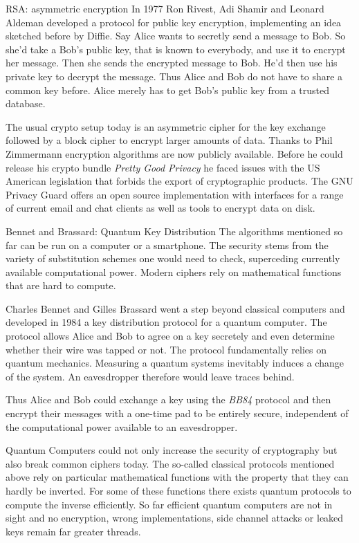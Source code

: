 \documentclass[final,hyperref={pdfpagelabels=false}]{beamer}
\begin{document}
\begin{frame}{}
\begin{columns}[t]
\begin{column}{.3\linewidth}
        \begin{block}{RSA: asymmetric encryption}
          In 1977 Ron Rivest, Adi Shamir and Leonard Aldeman developed a protocol for public key encryption, implementing an idea sketched before by Diffie. Say Alice wants to secretly send a message to Bob. So she'd take a Bob's public key, that is known to everybody, and use it to encrypt her message. Then she sends the encrypted message to Bob. He'd then use his private key to decrypt the message. Thus Alice and Bob do not have to share a common key before. Alice merely has to get Bob's public key from a trusted database. \par
          The usual crypto setup today is an asymmetric cipher for the key exchange followed by a block cipher to encrypt larger amounts of data. Thanks to Phil Zimmermann encryption algorithms are now publicly available. Before he could release his crypto bundle {\em Pretty Good Privacy} he faced issues with the US American legislation that forbids the export of cryptographic products. The GNU Privacy Guard offers an open source implementation with interfaces for a range of current email and chat clients as well as tools to encrypt data on disk.
        \end{block}

        \begin{block}{Bennet and Brassard: Quantum Key Distribution}
          The algorithms mentioned so far can be run on a computer or a smartphone. The security stems from the variety of substitution schemes one would need to check, superceding currently available computational power. Modern ciphers rely on mathematical functions that are hard to compute. \par 
          Charles Bennet and Gilles Brassard went a step beyond classical computers and developed in 1984 a key distribution protocol for a quantum computer. The protocol allows Alice and Bob to agree on a key secretely and even determine whether their wire was tapped or not. The protocol fundamentally relies on quantum mechanics. Measuring a quantum systems inevitably induces a change of the system. An eavesdropper therefore would leave traces behind. \par
          Thus Alice and Bob could exchange a key using the {\em BB84} protocol and then encrypt their messages with a one-time pad to be entirely secure, independent of the computational power available to an eavesdropper. \par
          Quantum Computers could not only increase the security of cryptography but also break common ciphers today. The so-called classical protocols mentioned above rely on particular mathematical functions with the property that they can hardly be inverted. For some of these functions there exists quantum protocols to compute the inverse efficiently. So far efficient quantum computers are not in sight and no encryption, wrong implementations, side channel attacks or leaked keys remain far greater threads.
        \end{block}
      \end{column}
    \end{columns}
  \end{frame}
\end{document}
